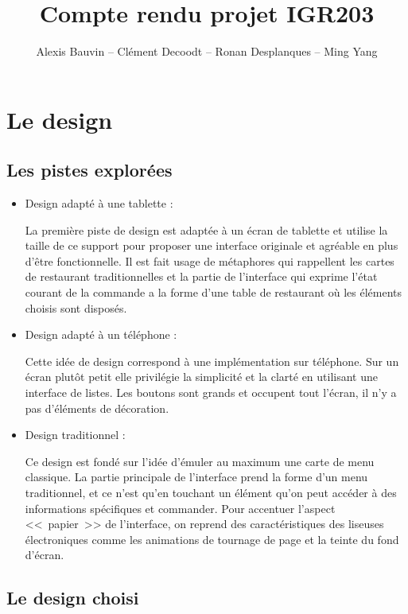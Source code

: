\documentclass[a4paper,12pt]{article}
\title{Compte rendu projet IGR203}
\author{Alexis Bauvin -- Clément Decoodt -- Ronan Desplanques -- Ming Yang}
\begin{document}
\maketitle

\section{Le design}

\subsection{Les pistes explorées}

\begin{itemize}
\item Design adapté à une tablette :

La première piste de design est adaptée à un écran de tablette et utilise la taille de ce support pour proposer
une interface originale et agréable en plus d'être fonctionnelle. Il est fait usage de métaphores qui rappellent
les cartes de restaurant traditionnelles et la partie de l'interface qui exprime l'état courant de la commande
a la forme d'une table de restaurant où les éléments choisis sont disposés.

\item Design adapté à un téléphone :

Cette idée de design correspond à une implémentation sur téléphone. Sur un écran plutôt petit elle privilégie la
simplicité et la clarté en utilisant une interface de listes. Les boutons sont grands et occupent tout l'écran,
il n'y a pas d'éléments de décoration.

\item Design traditionnel :

Ce design est fondé sur l'idée d'émuler au maximum une carte de menu classique. La partie principale de l'interface
prend la forme d'un menu traditionnel, et ce n'est qu'en touchant un élément qu'on peut accéder à des informations
spécifiques et commander. Pour accentuer l'aspect <<~papier~>> de l'interface, on reprend des caractéristiques des
liseuses électroniques comme les animations de tournage de page et la teinte du fond d'écran.

\end{itemize}

\subsection{Le design choisi}
\end{document}
